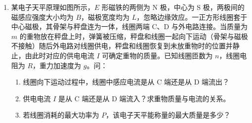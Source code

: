 \documentclass[\gkver]{gaokaozhenti}
\begin{document}
\begin{enumerate}
\onepicture[align=right, h=4.39cm]{}


\item
某电子天平原理如图所示，$E$ 形磁铁的两侧为 N 极，中心为 S 极，两极间的磁感应强度大小均为 $B$，磁极宽度均为 $L$，忽略边缘效应。一正方形线圈套于中心磁极，其骨架与秤盘连为一体，线圈两端 C、D 与外电路连接。当质量为 $m$ 的重物放在秤盘上时，弹簧被压缩，秤盘和线圈一起向下运动（骨架与磁极不接触）随后外电路对线圈供电，秤盘和线圈恢复到未放重物时的位置并静止，由此时对应的供电电流 $I$ 可确定重物的质量。已知线圈匝数为 $n$，线圈电阻为 $R$，重力加速度为 $g$。问：

\begin{enumerate}
	\item
	线圈向下运动过程中，线圈中感应电流是从 C 端还是从 D 端流出？
	\item
	供电电流 $I$ 是从 C 端还是从 D 端流入？求重物质量与电流的关系。
	\item
	若线圈消耗的最大功率为 $P$，该电子天平能称量的最大质量是多少？
\end{enumerate}


\end{enumerate}
\end{document}
